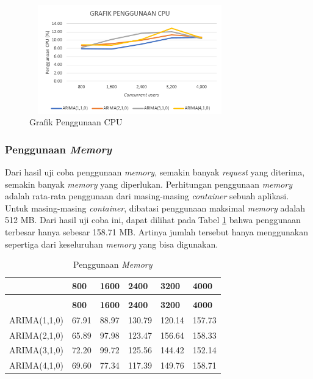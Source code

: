         	\begin{figure}[H]
				\centering
				\includegraphics[width=8.7cm,height=4.7cm]{Images/C-5/cpuusage.png}
				\caption{Grafik Penggunaan CPU}
				\label{gcpuusage}
			\end{figure}
            
        \subsubsection{Penggunaan \textit{Memory}}            
            Dari hasil uji coba penggunaan \textit{memory}, semakin banyak \textit{request} yang diterima, semakin banyak \textit{memory} yang diperlukan. Perhitungan penggunaan \textit{memory} adalah rata-rata penggunaan dari masing-masing \textit{container} sebuah aplikasi. Untuk masing-masing \textit{container}, dibatasi penggunaan maksimal \textit{memory} adalah 512 MB. Dari hasil uji coba ini, dapat dilihat pada Tabel \ref{penggunaanmemory} bahwa penggunaan terbesar hanya sebesar 158.71 MB. Artinya jumlah tersebut hanya menggunakan sepertiga dari keseluruhan \textit{memory} yang bisa digunakan.
            \begin{longtable}{|p{}|p{}|p{}|p{}|p{}|p{}|}
        \caption{Penggunaan \textit{Memory}} \label{penggunaanmemory} \\
            \hline
            & \textbf{800} & \textbf{1600} & \textbf{2400} & \textbf{3200} & \textbf{4000} \\ \hline
            \endfirsthead
            \caption[]{Penggunaan \textit{Memory}} \\
            \hline
            & \textbf{800} & \textbf{1600} & \textbf{2400} & \textbf{3200} & \textbf{4000} \\ \hline
            \endhead
            \endfoot
            \endlastfoot
			
           	ARIMA(1,1,0) & 67.91 & 88.97 & 130.79 & 120.14 & 157.73 \\ \hline
            ARIMA(2,1,0) & 65.89 & 97.98 & 123.47 & 156.64 & 158.33 \\ \hline
            ARIMA(3,1,0) & 72.20 & 99.72 & 125.56 & 144.42 & 152.14 \\ \hline
            ARIMA(4,1,0) & 69.60 & 77.34 & 117.39 & 149.76 & 158.71 \\ \hline

		\end{longtable}
            
